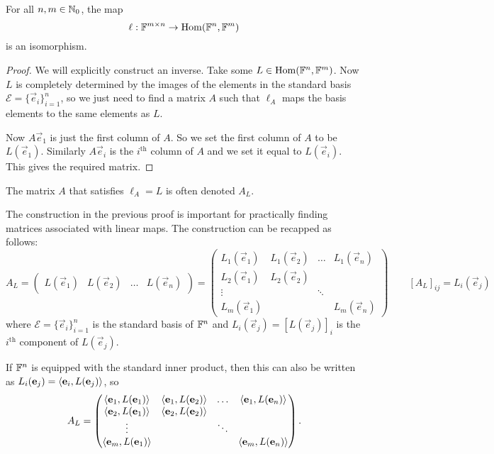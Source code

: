 \begin{proposition} \label{ellIsomorphism}
For all $n,m\in\mathbb{N}_0$, the map
\[ \ell: \mathbb{F}^{m\times n}\to \operatorname{Hom}(\mathbb{F}^n, \mathbb{F}^m) \]
is an isomorphism.
\end{proposition}
\begin{proof}
We will explicitly construct an inverse. Take some $L\in\operatorname{Hom}(\mathbb{F}^n, \mathbb{F}^m)$. Now $L$ is completely determined by the images of the elements in the standard basis $\mathcal{E}= \{\vec{e}_i\}_{i=1}^n$, so we just need to find a matrix $A$ such that $\ell_A$ maps the basis elements to the same elements as $L$.

Now $A\vec{e}_1$ is just the first column of $A$. So we set the first column of $A$ to be $L(\vec{e}_1)$. Similarly $A\vec{e}_i$ is the $i^\text{th}$ column of $A$ and we set it equal to $L(\vec{e}_i)$. This gives the required matrix.
\end{proof}
The matrix $A$ that satisfies $\ell_A = L$ is often denoted $A_L$.

The construction in the previous proof is important for practically finding matrices associated with linear maps. The construction can be recapped as follows:
\[ A_L = \begin{pmatrix}
L(\vec{e}_1) & L(\vec{e}_2) & \hdots & L(\vec{e}_n)
\end{pmatrix} = \begin{pmatrix}
L_1(\vec{e}_1) & L_1(\vec{e}_2) & \hdots & L_1(\vec{e}_n)  \\
L_2(\vec{e}_1) & L_2(\vec{e}_2) & & \\
\vdots & & \ddots & \\
L_m(\vec{e}_1) & & & L_m(\vec{e}_n)
\end{pmatrix} \qquad [A_L]_{ij} = L_i(\vec{e}_j) \]
where $\mathcal{E}= \{\vec{e}_i\}_{i=1}^n$ is the standard basis of $\mathbb{F}^n$ and $L_i(\vec{e}_j) = [L(\vec{e}_j)]_i$ is the $i^\text{th}$ component of $L(\vec{e}_j)$.

If $\mathbb{F}^n$ is equipped with the standard inner product, then this can also be written as $L_i(\boldsymbol{\mathrm{e}}_j) = \left\langle \boldsymbol{\mathrm{e}}_i, L(\boldsymbol{\mathrm{e}}_j) \right\rangle$, so
\[ A_L = \begin{pmatrix}
\left\langle \boldsymbol{\mathrm{e}}_1, L(\boldsymbol{\mathrm{e}}_1) \right\rangle & \left\langle \boldsymbol{\mathrm{e}}_1, L(\boldsymbol{\mathrm{e}}_2) \right\rangle & \hdots & \left\langle \boldsymbol{\mathrm{e}}_1, L(\boldsymbol{\mathrm{e}}_n) \right\rangle  \\
\left\langle \boldsymbol{\mathrm{e}}_2, L(\boldsymbol{\mathrm{e}}_1) \right\rangle & \left\langle \boldsymbol{\mathrm{e}}_2, L(\boldsymbol{\mathrm{e}}_2) \right\rangle & & \\
\vdots & & \ddots & \\
\left\langle \boldsymbol{\mathrm{e}}_m, L(\boldsymbol{\mathrm{e}}_1) \right\rangle & & & \left\langle \boldsymbol{\mathrm{e}}_m, L(\boldsymbol{\mathrm{e}}_n) \right\rangle
\end{pmatrix}. \]

